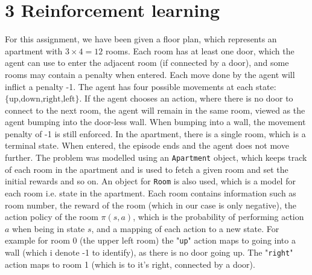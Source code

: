 \documentclass{article}
\begin{document}
\section{3 Reinforcement learning}
For this assignment, we have been given a floor plan, which represents an apartment with $3\times4=12$ rooms. Each room has at least one door, which the agent can use to enter the adjacent room (if connected by a door), and some rooms may contain a penalty when entered. Each move done by the agent will inflict a penalty -1. The agent has four possible movements at each state: $\lbrace \text{up,down,right,left} \rbrace$. If the agent chooses an action, where there is no door to connect to the next room, the agent will remain in the same room, viewed as the agent bumping into the door-less wall. When bumping into a wall, the movement penalty of -1 is still enforced. In the apartment, there is a single room, which is a terminal state. When entered, the episode ends and the agent does not move further. 
The problem was modelled using an \texttt{Apartment} object, which keeps track of each room in the apartment and is used to fetch a given room and set the initial rewards and so on. An object for \texttt{Room} is also used, which is a model for each room i.e. state in the apartment. Each room contains information such as room number, the reward of the room (which in our case is only negative), the action policy of the room $\pi(s,a)$, which is the probability of performing action $a$ when being in state $s$, and a mapping of each action to a new state. For example for room 0 (the upper left room) the "\texttt{up}" action maps to going into a wall (which i denote -1 to identify), as there is no door going up. The "\texttt{right}" action maps to room 1 (which is to it's right, connected by a door).
\end{document}
